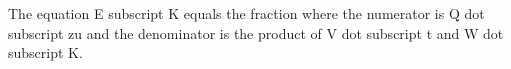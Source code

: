 The equation E subscript K equals the fraction where the numerator is Q dot subscript zu and the denominator is the product of V dot subscript t and W dot subscript K.